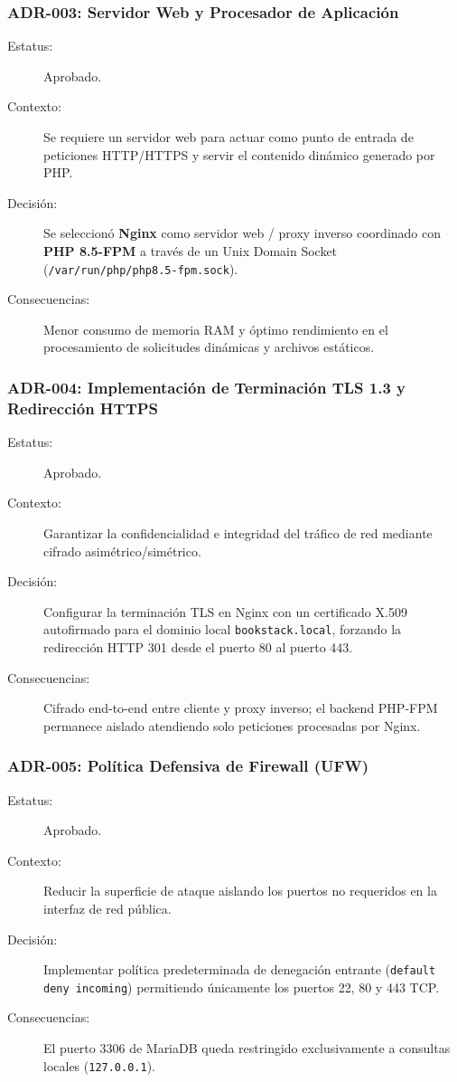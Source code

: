 \documentclass[12pt,a4paper]{article}
\begin{document}
\subsubsection{ADR-003: Servidor Web y Procesador de Aplicación}
\begin{description}
    \item[Estatus:] Aprobado.
    \item[Contexto:] Se requiere un servidor web para actuar como punto de entrada de peticiones HTTP/HTTPS y servir el contenido dinámico generado por PHP.
    \item[Decisión:] Se seleccionó \textbf{Nginx} como servidor web / proxy inverso coordinado con \textbf{PHP 8.5-FPM} a través de un Unix Domain Socket (\texttt{/var/run/php/php8.5-fpm.sock}).
    \item[Consecuencias:] Menor consumo de memoria RAM y óptimo rendimiento en el procesamiento de solicitudes dinámicas y archivos estáticos.
\end{description}

\subsubsection{ADR-004: Implementación de Terminación TLS 1.3 y Redirección HTTPS}
\begin{description}
    \item[Estatus:] Aprobado.
    \item[Contexto:] Garantizar la confidencialidad e integridad del tráfico de red mediante cifrado asimétrico/simétrico.
    \item[Decisión:] Configurar la terminación TLS en Nginx con un certificado X.509 autofirmado para el dominio local \texttt{bookstack.local}, forzando la redirección HTTP 301 desde el puerto 80 al puerto 443.
    \item[Consecuencias:] Cifrado end-to-end entre cliente y proxy inverso; el backend PHP-FPM permanece aislado atendiendo solo peticiones procesadas por Nginx.
\end{description}

\subsubsection{ADR-005: Política Defensiva de Firewall (UFW)}
\begin{description}
    \item[Estatus:] Aprobado.
    \item[Contexto:] Reducir la superficie de ataque aislando los puertos no requeridos en la interfaz de red pública.
    \item[Decisión:] Implementar política predeterminada de denegación entrante (\texttt{default deny incoming}) permitiendo únicamente los puertos 22, 80 y 443 TCP.
    \item[Consecuencias:] El puerto 3306 de MariaDB queda restringido exclusivamente a consultas locales (\texttt{127.0.0.1}).
\end{description}
\end{document}
